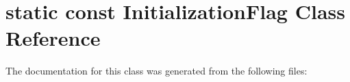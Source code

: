 \hypertarget{classstatic_01const_01InitializationFlag}{}\section{static const Initialization\+Flag Class Reference}
\label{classstatic_01const_01InitializationFlag}


The documentation for this class was generated from the following files\+: